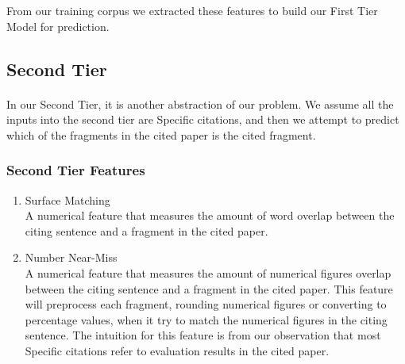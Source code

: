 From our training corpus we extracted these features to build our First Tier Model for prediction.

\subsection{Second Tier}
\paragraph{}
In our Second Tier, it is another abstraction of our problem. We assume all the inputs into the second tier are Specific citations, and then we attempt to predict which of the fragments in the cited paper is the cited fragment.

\subsubsection{Second Tier Features}
\begin{enumerate}
\item Surface Matching \\
A numerical feature that measures the amount of word overlap between the citing sentence and a fragment in the cited paper.

\item Number Near-Miss \\
A numerical feature that measures the amount of numerical figures overlap between the citing sentence and a fragment in the cited paper. This feature will preprocess each fragment, rounding numerical figures or converting to percentage values, when it try to match the numerical figures in the citing sentence. The intuition for this feature is from our observation that most Specific citations refer to evaluation results in the cited paper.
\end{enumerate}